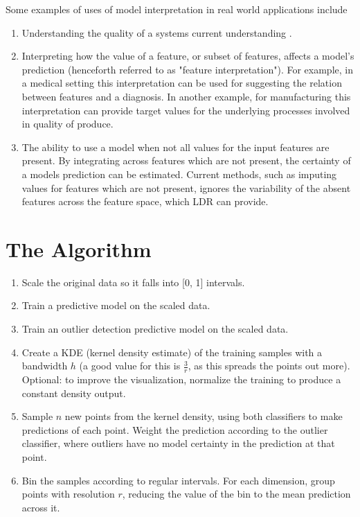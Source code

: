 \documentclass[a4paper, twocolumn]{article}
\begin{document}
Some examples of uses of model interpretation in real world applications include

\begin{enumerate}
\item Understanding the quality of a systems current understanding \cite{amershi2011effective}. 

\item Interpreting how the value of a feature, or subset of features, affects a model's prediction (henceforth referred to as "feature interpretation"). For example, in a medical setting this interpretation can be used for suggesting the relation between features and a diagnosis. In another example, for manufacturing this interpretation can provide target values for the underlying processes involved in quality of produce.

\item The ability to use a model when not all values for the input features are present. By integrating across features which are not present, the certainty of a models prediction can be estimated. Current methods, such as imputing values for features which are not present, ignores the variability of the absent features across the feature space, which LDR can provide.
\end{enumerate}

\section{The Algorithm}

\begin{enumerate}
\item Scale the original data so it falls into [0, 1] intervals.
\item Train a predictive model on the scaled data.
\item Train an outlier detection predictive model on the scaled data.
\item Create a KDE (kernel density estimate) \cite{parzen1962estimation} of the training samples with a bandwidth $h$ (a good value for this is $\frac{3}{r}$, as this spreads the points out more). Optional: to improve the visualization, normalize the training to produce a constant density output.
\item Sample $n$ new points from the kernel density, using both classifiers to make predictions of each point. Weight the prediction according to the outlier classifier, where outliers have no model certainty in the prediction at that point.
\item Bin the samples according to regular intervals. For each dimension, group points with resolution $r$, reducing the value of the bin to the mean prediction across it.
\end{enumerate}
\end{document}
